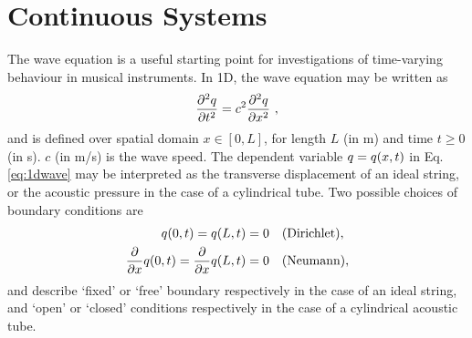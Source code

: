\section{Continuous Systems}\label{sec:continuous}
%
%
%

The wave equation is a useful starting point for investigations of time-varying behaviour in musical instruments. In 1D, the wave equation may be written as
\begin{equation}\label{eq:1dwave}
    \frac{\partial^2 q}{\partial t^2}= c^2\frac{\partial^2 q}{\partial x^2}\ ,
\end{equation}
and is defined over spatial domain $x \in [0, L]$, for length $L$ (in m) and time $t \geq 0$ (in s). $c$ (in m/s) is the wave speed. The dependent variable $q = q(x,t)$ in Eq. \eqref{eq:1dwave} may be interpreted as the transverse displacement of an ideal string, or the acoustic pressure in the case of a cylindrical tube. Two possible choices of boundary conditions are
\begin{subequations}\label{eq:continuousBoundaries}
    \begin{align}
        q(0, t) = q(L, t) &= 0\quad \text{(Dirichlet)},\label{eq:contDirichlet}\\
        \frac{\partial}{\partial x} q(0, t) = \frac{\partial}{\partial x} q(L, t) &= 0\quad \text{(Neumann)},\label{eq:contNeumann}
    \end{align}
\end{subequations}
and describe `fixed' or `free' boundary respectively in the case of an ideal string, and `open' or `closed' conditions respectively in the case of a cylindrical acoustic tube.

